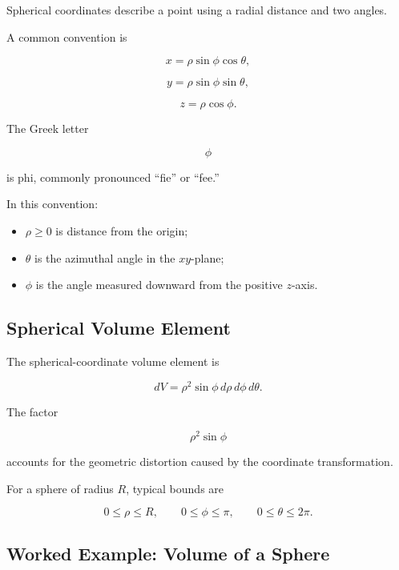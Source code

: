 Spherical coordinates describe a point using a radial distance and two
angles.

A common convention is

\[ x=\rho\sin\phi\cos\theta, \]

\[ y=\rho\sin\phi\sin\theta, \]

\[ z=\rho\cos\phi. \]

The Greek letter

\[ \phi \]

is phi, commonly pronounced ``fie'' or ``fee.''

In this convention:

\begin{itemize}
    \item \(\rho\geq0\) is distance from the origin;
    \item \(\theta\) is the azimuthal angle in the \(xy\)-plane;
    \item \(\phi\) is the angle measured downward from the positive \(z\)-axis.
\end{itemize}

\subsection{Spherical Volume Element}
\label{subsec:spherical-volume-element}

The spherical-coordinate volume element is

\[ \boxed{
dV=\rho^2\sin\phi\,d\rho\,d\phi\,d\theta.
} \]

The factor

\[ \rho^2\sin\phi \]

accounts for the geometric distortion caused by the coordinate
transformation.

For a sphere of radius \(R\), typical bounds are

\[ 0\leq\rho\leq R,\qquad
0\leq\phi\leq\pi,\qquad
0\leq\theta\leq2\pi. \]

\subsection{Worked Example: Volume of a Sphere}
\label{subsec:worked-sphere-volume}

